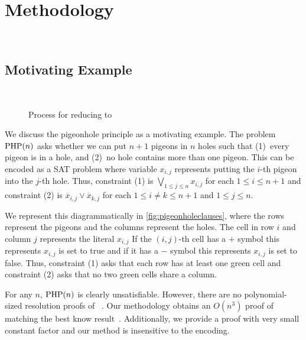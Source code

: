 \section{Methodology}~\label{sec:method}

\subsection{Motivating Example}~\label{sec:motivatex}

\begin{figure*}[!t]
    \centering
    
    \caption{Process for reducing  to }
  \end{figure*}

We discuss the pigeonhole principle as a motivating example. The problem $\mathrm{PHP}(n)$ asks 
whether we can put $n+1$ pigeons in $n$ holes such that (1)~every pigeon is in a 
hole, and (2)~no hole contains more than one pigeon. This can be 
encoded as a SAT problem where variable $x_{i, j}$ represents putting the 
$i$-th pigeon into the $j$-th hole. Thus, constraint (1) is $\bigvee_{1 \leq j \leq n} x_{i, j}$ for each $1 \leq i \leq n+1$ and constraint (2) is $\overline{x}_{i, j} \lor \overline{x}_{k, j}$ for each $ 1 \leq i \neq k \leq n+1$ and $1 \leq j \leq n$.

We represent this diagrammatically in \autoref{fig:pigeonholeclauses}, where the rows represent the pigeons and the columns represent the holes. The cell in row $i$ and column $j$ represents the literal $x_{i, j}$
If the $(i, j)$-th cell has a $+$ symbol this represents $x_{i, j}$ is set to true and if it has a $-$ symbol this represents $x_{i, j}$ is set to false. Thus, constraint (1) asks that each row has at least one green cell and constraint (2) asks that no two green cells share a column.

For any $n$, $\mathrm{PHP}(n)$ is clearly unsatisfiable. However, there are no polynomial-sized resolution proofs of ~\cite{hakenpigeonhole}. Our methodology obtains an $O(n^3)$ \pr proof of  matching the best know result~\cite{prclauses}. Additionally, we provide a proof with very small constant factor and our method is insensitive to the encoding.


